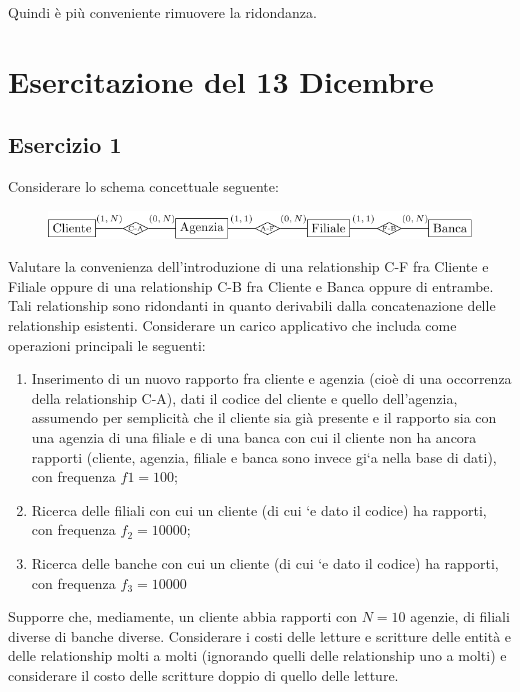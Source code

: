 \documentclass{article}
\numberwithin{equation}{subsection}
\begin{document}
Quindi è più conveniente rimuovere la ridondanza. 

\clearpage

\section{Esercitazione del 13 Dicembre}


\subsection{Esercizio 1}

Considerare lo schema concettuale seguente:
\begin{figure}[H]%
    \centering%
    \includegraphics{ridondanza_13-12-24.pdf}%
\end{figure}

Valutare la convenienza dell'introduzione di una relationship C-F fra Cliente e Filiale oppure di una relationship 
C-B fra Cliente e Banca oppure di entrambe. Tali relationship sono ridondanti in quanto derivabili dalla 
concatenazione delle relationship esistenti. Considerare un carico applicativo che includa come operazioni 
principali le seguenti:
\begin{enumerate}
    \item Inserimento di un nuovo rapporto fra cliente e agenzia (cioè di una occorrenza della relationship C-A), 
    dati il codice del cliente e quello dell'agenzia, assumendo per semplicità che il cliente sia già presente e il
    rapporto sia con una agenzia di una filiale e di una banca con cui il cliente non ha ancora rapporti (cliente,
    agenzia, filiale e banca sono invece gi`a nella base di dati), con frequenza $f1 = 100$;
    \item Ricerca delle filiali con cui un cliente (di cui `e dato il codice) ha rapporti, con frequenza $f_2 = 10000$;
    \item Ricerca delle banche con cui un cliente (di cui `e dato il codice) ha rapporti, con frequenza $f_3 = 10000$ 
\end{enumerate}
Supporre che, mediamente, un cliente abbia rapporti con $N = 10$ agenzie, di filiali diverse di banche diverse. 
Considerare i costi delle letture e scritture delle entità e delle relationship molti a molti (ignorando quelli delle 
relationship uno a molti) e considerare il costo delle scritture doppio di quello delle letture. 
\end{document}
